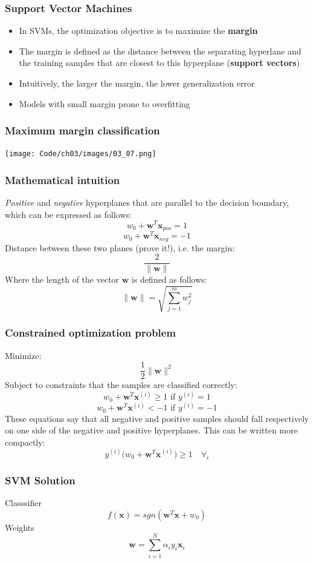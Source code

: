\documentclass{beamer}
\begin{document}
\begin{frame}
  \frametitle{Support Vector Machines}
  \begin{itemize}
  \item In SVMs, the optimization objective is to maximize the \textbf{margin}
  \item The margin is defined as the distance between the separating hyperlane and the training samples that are closest to this hyperplane (\textbf{support vectors})
  \item Intuitively, the larger the margin, the lower generalization error
  \item Models with small margin prone to overfitting
  \end{itemize}
\end{frame}

\begin{frame}
  \frametitle{Maximum margin classification}
  \texttt{[image: Code/ch03/images/03\_07.png]}
\end{frame}

\begin{frame}
  \frametitle{Mathematical intuition}
  \textit{Positive} and \textit{negative} hyperplanes that are parallel to the decision boundary, which can be expressed as follows:
  \[
  w_0 + \mathbf{w}^T \mathbf{x}_{pos} = 1
  \]
  \[
  w_0 + \mathbf{w}^T \mathbf{x}_{neg} = -1
  \]
  Distance between these two planes (prove it!), i.e. the margin:
  \[
  \frac{2}{\lVert \mathbf{w} \rVert}
  \]
  Where the length of the vector $\mathbf{w}$ is defined as follows:
  \[
  \lVert \mathbf{w} \rVert = \sqrt{\sum_{j=1}^{m} w_{j}^{2}}
  \]
\end{frame}

\begin{frame}
  \frametitle{Constrained optimization problem}
  Minimize:
  \[
  \frac{1}{2} \lVert \mathbf{w} \rVert^2
  \]
  Subject to constraints that the samples are classified correctly:
  \[
  w_0 + \mathbf{w}^T \mathbf{x}^{(i)} \ge 1 \text{ if } y^{(i)} = 1
  \]
  \[
  w_0 + \mathbf{w}^T \mathbf{x}^{(i)}  < -1 \text{ if } y^{(i)} = -1
  \]
  These equations say that all negative and positive samples should fall respectively on one side of the negative and positive hyperplanes. This can be written more compactly:
  \[
  y^{(i)} \big(  w_0 + \mathbf{w}^T \mathbf{x}^{(i)} \big) \ge 1 \quad \forall_i
  \]
\end{frame}

\begin{frame}
  \frametitle{SVM Solution}
  Classsifier
  \[
  f(\mathbf{x}) = sgn(\mathbf{w}^T \mathbf{x} + w_0)
  \]
  Weights
  \[
  \mathbf{w} = \sum_{i=1}^N \alpha_i y_i \mathbf{x}_i
  \]
\end{frame}
\end{document}
